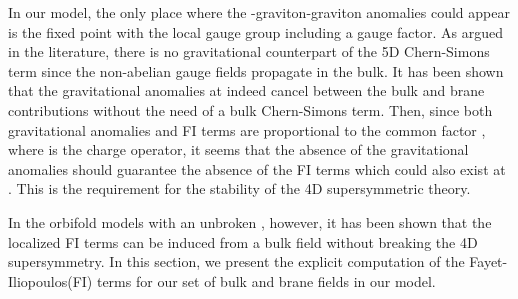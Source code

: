 \documentclass[a4paper,12pt]{article}
\begin{document}
In our model, the only place where the \coordHE{}-graviton-graviton anomalies 
could appear is the fixed point \coordHE{} with
the local gauge group including a \coordHE{} gauge factor. As argued 
in the literature\cite{kkl}, 
there is no gravitational counterpart \coordHE{} 
of the 5D Chern-Simons term since the non-abelian gauge fields propagate 
in the bulk. It has been shown that the gravitational anomalies at \coordHE{}
indeed cancel between the bulk and brane contributions without the need of
a bulk Chern-Simons term\cite{kkl}. Then, since both gravitational anomalies
and FI terms are proportional to the common factor \coordHE{}, 
where \coordHE{} is the \coordHE{} charge operator, it seems that
the absence of the gravitational anomalies should guarantee
the absence of the FI terms which could also exist at \coordHE{}. This is
the requirement for the stability of the 4D supersymmetric theory. 

In the orbifold models with an unbroken \coordHE{}, however, it has been shown that 
the localized FI terms can be induced from a bulk field without breaking the 4D
supersymmetry\cite{scrucca,barbieri,nilles,pomarol}.
In this section, we present the explicit computation of
the Fayet-Iliopoulos(FI) terms\cite{nilles2,nilles}
for our set of bulk and brane fields in our model. 
\end{document}
